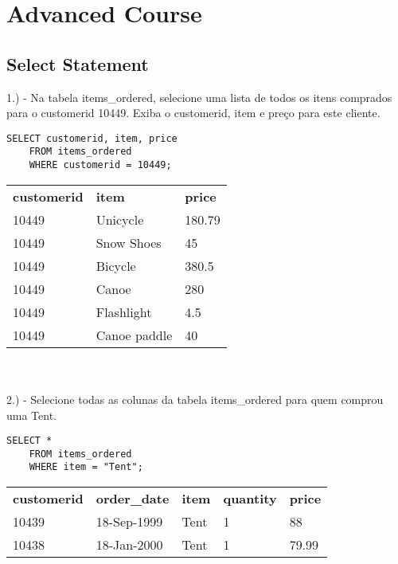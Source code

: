 \section{Advanced Course}

\subsection{Select Statement}

1.) - Na tabela items\_ordered, selecione uma lista de todos os itens comprados para o customerid 10449. Exiba o customerid, item e preço para este cliente.

\begin{lstlisting}
SELECT customerid, item, price
	FROM items_ordered
	WHERE customerid = 10449;
\end{lstlisting}

\begin{tabular}{l l l}
    {\textbf{customerid}} & {\textbf{item}} & {\textbf{price}} \\
    {10449}               & {Unicycle}      & {180.79}         \\
    {10449}               & {Snow Shoes}    & {45}             \\
    {10449}               & {Bicycle}       & {380.5}          \\
    {10449}               & {Canoe}         & {280}            \\
    {10449}               & {Flashlight}    & {4.5}            \\
    {10449}               & {Canoe paddle}  & {40}            
\end{tabular} \\ \\

2.) - Selecione todas as colunas da tabela items\_ordered para quem comprou uma Tent.

\begin{lstlisting}
SELECT *
	FROM items_ordered
	WHERE item = "Tent";
\end{lstlisting}

\begin{tabular}{l l l l l}
    {\textbf{customerid}} & {\textbf{order\_date}} & {\textbf{item}} & {\textbf{quantity}} & {\textbf{price}} \\
    {10439}               & {18-Sep-1999}          & {Tent}          & {1}                 & {88}             \\
    {10438}               & {18-Jan-2000}          & {Tent}          & {1}                 & {79.99}         
\end{tabular} \\ \\

